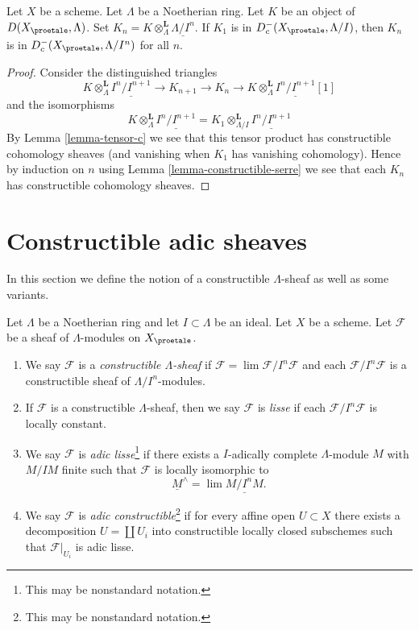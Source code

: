 \begin{lemma}
\label{lemma-compare-truncations-constructible}
Let $X$ be a scheme. Let $\Lambda$ be a Noetherian ring.
Let $K$ be an object of $D(X_\proetale, \Lambda)$.
Set $K_n = K \otimes_\Lambda^\mathbf{L} \underline{\Lambda/I^n}$.
If $K_1$ is in $D^-_c(X_\proetale, \Lambda/I)$, then
$K_n$ is in $D^-_c(X_\proetale, \Lambda/I^n)$ for all $n$.
\end{lemma}

\begin{proof}
Consider the distinguished triangles
$$
K \otimes_\Lambda^\mathbf{L} \underline{I^n/I^{n + 1}} \to
K_{n + 1} \to
K_n \to
K \otimes_\Lambda^\mathbf{L} \underline{I^n/I^{n + 1}}[1]
$$
and the isomorphisms
$$
K \otimes_\Lambda^\mathbf{L} \underline{I^n/I^{n + 1}} =
K_1 \otimes_{\Lambda/I}^\mathbf{L} \underline{I^n/I^{n + 1}}
$$
By Lemma \ref{lemma-tensor-c} we see that this tensor product has
constructible cohomology sheaves (and vanishing when $K_1$ has
vanishing cohomology). Hence by induction on $n$ using
Lemma \ref{lemma-constructible-serre}
we see that each $K_n$ has constructible cohomology sheaves.
\end{proof}








\section{Constructible adic sheaves}
\label{section-adic}

\noindent
In this section we define the notion of a constructible
$\Lambda$-sheaf as well as some variants.

\begin{definition}
\label{definition-adic}
Let $\Lambda$ be a Noetherian ring and let $I \subset \Lambda$ be an ideal.
Let $X$ be a scheme. Let $\mathcal{F}$ be a sheaf of $\Lambda$-modules
on $X_\proetale$.
\begin{enumerate}
\item We say $\mathcal{F}$ is a {\it constructible $\Lambda$-sheaf}
if $\mathcal{F} = \lim \mathcal{F}/I^n\mathcal{F}$ and each
$\mathcal{F}/I^n\mathcal{F}$ is a constructible sheaf of $\Lambda/I^n$-modules.
\item If $\mathcal{F}$ is a constructible $\Lambda$-sheaf, then we say
$\mathcal{F}$ is {\it lisse} if each $\mathcal{F}/I^n\mathcal{F}$ is
locally constant.
\item We say $\mathcal{F}$ is {\it adic lisse}\footnote{This may
be nonstandard notation.} if there exists a
$I$-adically complete $\Lambda$-module $M$ with $M/IM$ finite
such that $\mathcal{F}$ is locally isomorphic to
$$
\underline{M}^\wedge = \lim \underline{M/I^nM}.
$$
\item We say $\mathcal{F}$ is
{\it adic constructible}\footnote{This may be nonstandard notation.}
if for every affine open $U \subset X$
there exists a decomposition $U = \coprod U_i$ into
constructible locally closed subschemes such that $\mathcal{F}|_{U_i}$
is adic lisse.
\end{enumerate}
\end{definition}

